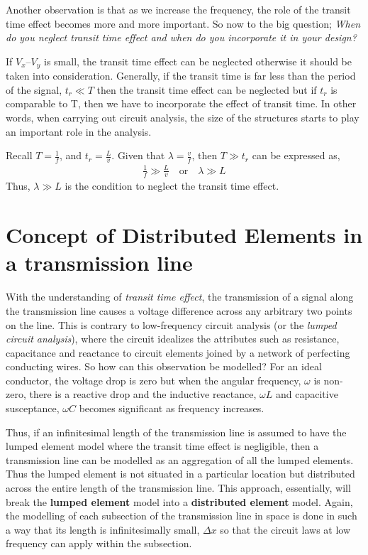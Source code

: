 Another observation is that as we increase the frequency, the role of the transit time effect becomes more and more important. So now to the big question; \textit{When do you neglect transit time effect and when do you incorporate it in your design?}

If $ V_{x} – V_{y} $ is small, the transit time effect can be neglected otherwise it should be taken into consideration. Generally, if the transit time is far less than the period of the signal,  $ t_{r} \ll T $ then the transit time effect can be neglected but if $ t_{r} $ is comparable to T, then we have to incorporate the effect of transit time. In other words, when carrying out circuit analysis, the size of the structures starts to play an important role in the analysis.

Recall $T = \frac{1}{f} $, and $t_{r} = \frac{L}{v}$. Given that $ \lambda = \frac{v}{f} $, then $T \gg t_r$ can be expressed as, 
\begin{align*}
\frac{1}{f} \gg \frac{L}{v}\quad\text{or}\quad\lambda \gg L
\end{align*}
Thus, $ \lambda \gg L $ is the condition to neglect the transit time effect.

\section{Concept of Distributed Elements in a transmission line}
With the understanding of \textit{transit time effect}, the transmission of a signal along the transmission line causes a voltage difference across any arbitrary two points on the line. This is contrary to low-frequency circuit analysis (or the \textit{lumped circuit analysis}), where the circuit idealizes the attributes such as resistance, capacitance and reactance to circuit elements joined by a network of perfecting conducting wires. So how can this observation be modelled? For an ideal conductor, the voltage drop is zero but when the angular frequency, $\omega$ is non-zero, there is a reactive drop and the inductive reactance, $\omega L$ and capacitive susceptance, $\omega C$ becomes significant as frequency increases.

Thus, if an infinitesimal length of the transmission line is assumed to have the lumped element model where the transit time effect is negligible, then a transmission line can be modelled as an aggregation of all the lumped elements. Thus the lumped element is not situated in a particular location but distributed across the entire length of the transmission line. This approach, essentially, will break the \textbf{lumped element} model into a \textbf{distributed element} model. Again, the modelling of each subsection of the transmission line in space is done in such a way that its length is infinitesimally small, $\Delta x$ so that the circuit laws at low frequency can apply within the subsection.


